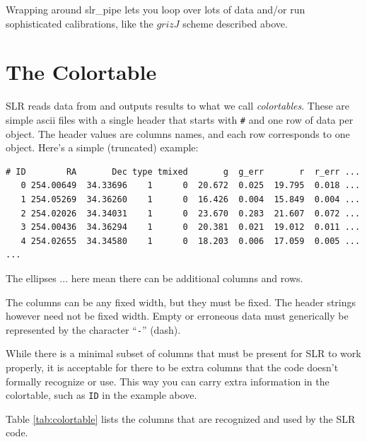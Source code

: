 \documentclass{report}
\begin{document}
Wrapping around slr\_pipe lets you loop over lots of data and/or run
sophisticated calibrations, like the $grizJ$ scheme described above.

\chapter{The Colortable}
\label{sec:colortable}

SLR reads data from and outputs results to what we call {\it
  colortables}.  These are simple ascii files with a single header
that starts with \verb|#| and one row of data per object.  The header
values are columns names, and each row corresponds to one object.
Here's a simple (truncated) example:
\begin{verbatim}
# ID        RA       Dec type tmixed       g  g_err       r  r_err ...
   0 254.00649  34.33696    1      0  20.672  0.025  19.795  0.018 ...
   1 254.05269  34.36260    1      0  16.426  0.004  15.849  0.004 ...
   2 254.02026  34.34031    1      0  23.670  0.283  21.607  0.072 ...
   3 254.00436  34.36294    1      0  20.381  0.021  19.012  0.011 ...
   4 254.02655  34.34580    1      0  18.203  0.006  17.059  0.005 ...
...
\end{verbatim}
The ellipses ... here mean there can be additional columns and rows.

The columns can be any fixed width, but they must be fixed.  The
header strings however need not be fixed width.  Empty or erroneous
data must generically be represented by the character ``\verb|-|''
(dash).

While there is a minimal subset of columns that must be present for
SLR to work properly, it is acceptable for there to be extra columns
that the code doesn't formally recognize or use.  This way you can
carry extra information in the colortable, such as \verb|ID| in the
example above.

Table \ref{tab:colortable} lists the columns that are recognized and
used by the SLR code.
\end{document}
